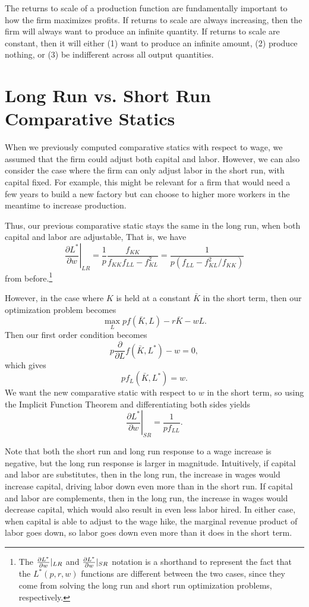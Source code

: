 The returns to scale of a production function are fundamentally important to how the firm maximizes profits. If returns to scale are always increasing, then the firm will always want to produce an infinite quantity. If returns to scale are constant, then it will either (1) want to produce an infinite amount, (2) produce nothing, or (3) be indifferent across all output quantities.

\section{Long Run vs. Short Run Comparative Statics}

When we previously computed comparative statics with respect to wage, we assumed that the firm could adjust both capital and labor. However, we can also consider the case where the firm can only adjust labor in the short run, with capital fixed. For example, this might be relevant for a firm that would need a few years to build a new factory but can choose to higher more workers in the meantime to increase production.

Thus, our previous comparative static stays the same in the long run, when both capital and labor are adjustable, That is, we have 
$$\left.\frac{\partial L^{*}}{\partial w}\right|_{L R}=\frac{1}{p} \frac{f_{K K}}{f_{K K} f_{L L}-f_{K L}^{2}}=\frac{1}{p\left(f_{L L}-f_{K L}^{2} / f_{K K}\right)}$$
from before.\footnote{The $\pdv{L^*}{w}|_{LR}$ and $\pdv{L^*}{w}|_{SR}$ notation is a shorthand to represent the fact that the $L^*(p, r, w)$ functions are different between the two cases, since they come from solving the long run and short run optimization problems, respectively.}

However, in the case where $K$ is held at a constant $\bar{K}$ in the short term, then our optimization problem becomes
$$\max_L pf(\bar{K}, L) - r\bar{K} - wL.$$
Then our first order condition becomes
$$p\frac{\partial}{\partial L} f(\bar{K}, L^*) - w = 0,$$
which gives
$$pf_L(\bar{K}, L^*) = w.$$
We want the new comparative static with respect to $w$ in the short term, so using the Implicit Function Theorem and differentiating both sides yields
$$\left.\frac{\partial L^{*}}{\partial w}\right|_{S R}=\frac{1}{p f_{L L}}.$$

Note that both the short run and long run response to a wage increase is negative, but the long run response is larger in magnitude. Intuitively, if capital and labor are substitutes, then in the long run, the increase in wages would increase capital, driving labor down even more than in the short run. If capital and labor are complements, then in the long run, the increase in wages would decrease capital, which would also result in even less labor hired. In either case, when capital is able to adjust to the wage hike, the marginal revenue product of labor goes down, so labor goes down even more than it does in the short term.

